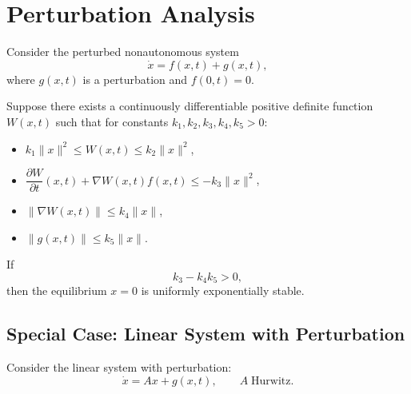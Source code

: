 \section{Perturbation Analysis}

Consider the perturbed nonautonomous system
\begin{equation}
\dot{x} = f(x,t) + g(x,t),
\end{equation}
where \(g(x,t)\) is a perturbation and \(f(0,t)=0\).

\begin{theorem}
Suppose there exists a continuously differentiable positive definite function \(W(x,t)\) such that for constants \(k_1,k_2,k_3,k_4,k_5>0\):\\
\begin{itemize}
    \item \(k_1 \|x\|^2 \le W(x,t) \le k_2 \|x\|^2\),
    \item \(\dfrac{\partial W}{\partial t}(x,t) + \nabla W(x,t) f(x,t) \le -k_3 \|x\|^2\),
    \item \(\|\nabla W(x,t)\| \le k_4 \|x\|\),
    \item \(\|g(x,t)\| \le k_5 \|x\|\).
\end{itemize}
If
\begin{equation}
k_3 - k_4 k_5 > 0,
\end{equation}
then the equilibrium \(x=0\) is uniformly exponentially stable.
\end{theorem}

\subsection{Special Case: Linear System with Perturbation}

Consider the linear system with perturbation:
\begin{equation}
\dot{x} = A x + g(x,t), \qquad A \;\text{Hurwitz}.
\end{equation}

